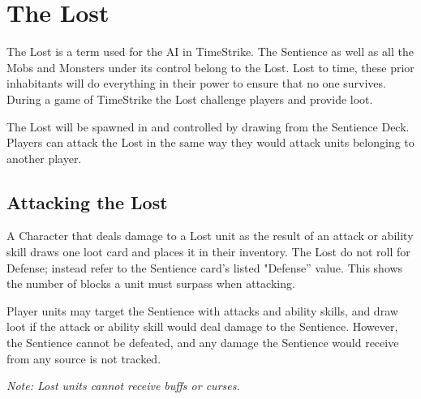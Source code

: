 \documentclass[../main.tex]{subfiles}
\begin{document}
\section{The Lost}
The Lost is a term used for the AI in TimeStrike. The Sentience as well as all the Mobs and Monsters under its control belong to the Lost. Lost to time, these prior inhabitants will do everything in their power to ensure that no one survives. During a game of TimeStrike the Lost challenge players and provide loot.

The Lost will be spawned in and controlled by drawing from the Sentience Deck. Players can attack the Lost in the same way they would attack units belonging to another player.

\subsection{Attacking the Lost}
A Character that deals damage to a Lost unit as the result of an attack or ability skill draws one loot card and places it in their inventory. The Lost do not roll for Defense; instead refer to the Sentience card’s listed "Defense” value. This shows the number of blocks a unit must surpass when attacking.

Player units may target the Sentience with attacks and ability skills, and draw loot if the attack or ability skill would deal damage to the Sentience. However, the Sentience cannot be defeated, and any damage the Sentience would receive from any source is not tracked.

\textit{Note: Lost units cannot receive buffs or curses.}

\clearpage
\end{document}
